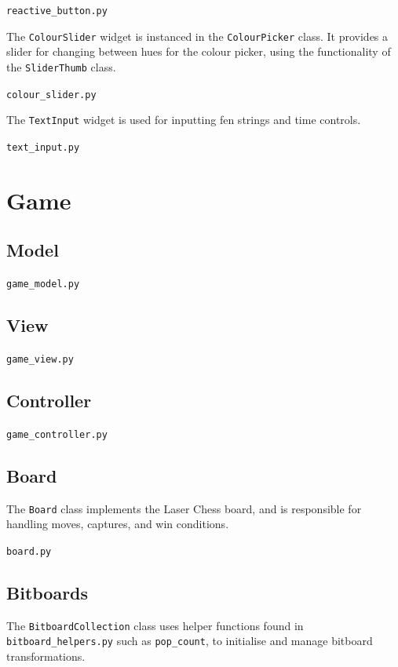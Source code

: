 \documentclass[../main/main.tex]{subfiles}
\begin{document}
\noindent\verb|reactive_button.py|


\bigskip
\noindent The \lstinline{ColourSlider} widget is instanced in the \lstinline{ColourPicker} class. It provides a slider for changing between hues for the colour picker, using the functionality of the \lstinline{SliderThumb} class.

\noindent\verb|colour_slider.py|


\bigskip
\noindent The \lstinline{TextInput} widget is used for inputting fen strings and time controls.

\noindent\verb|text_input.py|


\section{Game}
\subsection{Model}
\noindent\verb|game_model.py|


\subsection{View}
\noindent\verb|game_view.py|


\subsection{Controller}
\noindent\verb|game_controller.py|


\subsection{Board}
The \lstinline{Board} class implements the Laser Chess board, and is responsible for handling moves, captures, and win conditions.

\noindent\verb|board.py|


\subsection{Bitboards}
The \lstinline{BitboardCollection} class uses helper functions found in \lstinline{bitboard_helpers.py} such as \lstinline{pop_count}, to initialise and manage bitboard transformations.
\end{document}
